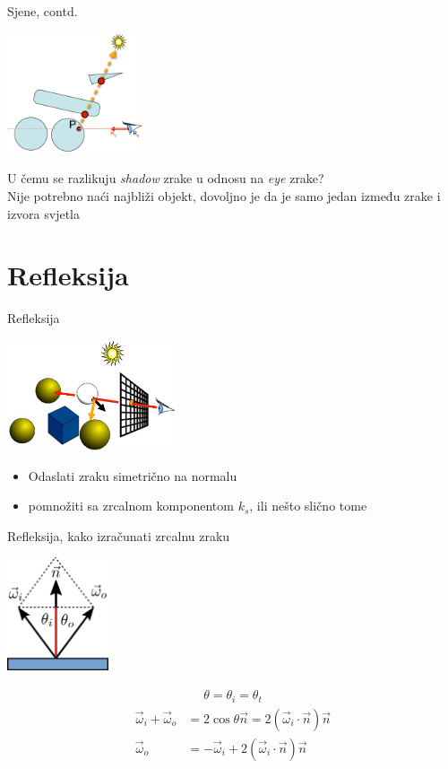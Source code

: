 \documentclass[9pt]{beamer}
\begin{document}
\begin{frame}{Sjene, contd.}
\begin{center}
\includegraphics[width=4cm]{slike/sjene_02.png}
\end{center}
U čemu se razlikuju \textit{shadow} zrake u odnosu na \textit{eye} zrake?\\
Nije potrebno naći najbliži objekt, dovoljno je da je samo jedan između zrake i izvora svjetla 
\end{frame}

\section{Refleksija}
\begin{frame}{Refleksija}

\begin{center}
\includegraphics[width=5cm]{slike/refleksija_01.png}
\end{center}
\begin{itemize}
\item Odaslati zraku simetrično na normalu
\item pomnožiti sa zrcalnom komponentom $k_s$, ili nešto slično tome
\end{itemize}
\end{frame}

\begin{frame}{Refleksija, kako izračunati zrcalnu zraku}

\begin{center}
	\includegraphics[width=3cm]{slike/refleksija.png}
\end{center}
\begin{align*}
	\theta= \theta_i = \theta_t
\end{align*}
\begin{align*}
\vec{\omega}_i + \vec{\omega}_o & = 2 \cos \theta \vec{n} = 2(\vec{\omega}_i \cdot \vec{n})\vec{n} \\
 \vec{\omega}_o & = -\vec{\omega}_i + 2(\vec{\omega}_i \cdot \vec{n})\vec{n}
\end{align*}
\end{frame}
\end{document}
